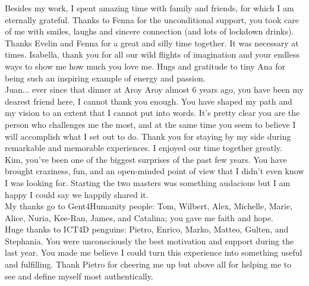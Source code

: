\begin{acknowledgements}
{Besides my work, I spent amazing time with family and friends, for which I am eternally grateful.
Thanks to Fenna for the unconditional support, you took care of me with smiles, laughs and sincere connection (and lots of lockdown drinks). Thanks Evelin and Fenna for a great and silly time together. It was necessary at times. Isabella, thank you for all our wild flights of imagination and your endless ways to show me how much you love me. Hugs and gratitude to tiny Ana for being such an inspiring example of energy and passion. \\
Juan... ever since that dinner at Aroy Aroy almost 6 years ago, you have been my dearest friend here, I cannot thank you enough. You have shaped my path and my vision to an extent that I cannot put into words. It's pretty clear you are the person who challenges me the most, and at the same time you seem to believe I will accomplish what I set out to do. Thank you for staying by my side during remarkable and memorable experiences. I enjoyed our time together greatly. \\
Kim, you've been one of the biggest surprises of the past few years. You have brought craziness, fun, and an open-minded point of view that I didn't even know I was looking for. Starting the two masters was something audacious but I am happy I could say we happily shared it.\\
My thanks go to Gent4Humanity people: Tom, Wilbert, Alex, Michelle, Marie, Alice, Nuria, Kee-Ran, James, and Catalina; you gave me faith and hope. \\
Huge thanks to ICT4D penguins: Pietro, Enrico, Marko, Matteo, Gulten, and Stephania. You were unconsciously the best motivation and support during the last year. You made me believe I could turn this experience into something useful and fulfilling. Thank Pietro for cheering me up but above all for helping me to see and define myself most authentically.\\

}
\end{acknowledgements}
